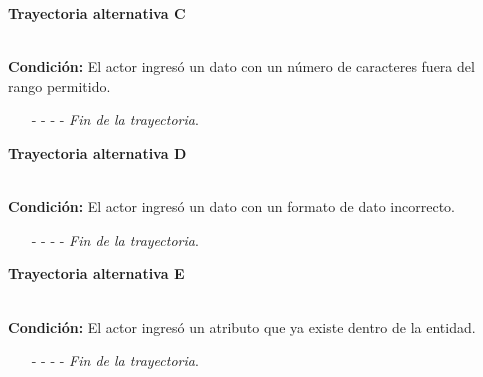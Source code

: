 \hypertarget{CU7-1-1:TAC}{\textbf{Trayectoria alternativa C}}\\
\noindent \textbf{Condición:} El actor ingresó un dato con un número de caracteres fuera del rango permitido.
\begin{enumerate}
	\UCpaso[\UCsist] Muestra el mensaje  señalando el campo que presenta el error en la pantalla .
	\UCpaso Regresa al paso \ref{CU7.1.1-P3} de la trayectoria principal.
	\item[- -] - - {\em {Fin de la trayectoria}}.%
\end{enumerate}
\hypertarget{CU7-1-1:TAD}{\textbf{Trayectoria alternativa D}}\\
\noindent \textbf{Condición:} El actor ingresó un dato con un formato de dato incorrecto.
\begin{enumerate}
	\UCpaso[\UCsist] Muestra el mensaje  señalando el campo que presenta el error en la pantalla .
	\UCpaso Regresa al paso \ref{CU7.1.1-P3} de la trayectoria principal.
	\item[- -] - - {\em {Fin de la trayectoria}}.
\end{enumerate}
\hypertarget{CU7-1-1:TAE}{\textbf{Trayectoria alternativa E}}\\
\noindent \textbf{Condición:} El actor ingresó un atributo que ya existe dentro de la entidad.
\begin{enumerate}
	\UCpaso[\UCsist] Muestra el mensaje  señalando el campo que presenta la duplicidad en la pantalla .
	\UCpaso Regresa al paso \ref{CU7.1.1-P3} de la trayectoria principal.
	\item[- -] - - {\em {Fin de la trayectoria}}.
\end{enumerate}